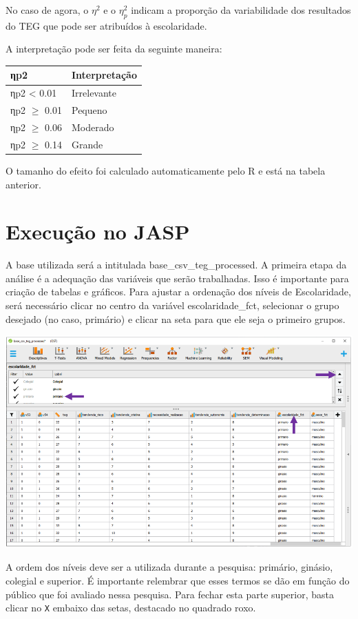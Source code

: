 \documentclass[
]{book}
\begin{document}
No caso de agora, o \(\eta^2\) e o \(\eta_p^2\) indicam a proporção da variabilidade dos resultados do TEG que pode ser atribuídos à escolaridade.

A interpretação pode ser feita da seguinte maneira:

\begin{longtable}[]{@{}ll@{}}
\toprule
ηp2 & Interpretação \\
\midrule
\endhead
ηp2 \textless{} 0.01 & Irrelevante \\
ηp2 \(\geq\) 0.01 & Pequeno \\
ηp2 \(\geq\) 0.06 & Moderado \\
ηp2 \(\geq\) 0.14 & Grande \\
\bottomrule
\end{longtable}

O tamanho do efeito foi calculado automaticamente pelo R e está na tabela anterior.

\hypertarget{execuuxe7uxe3o-no-jasp-6}{%
\section{Execução no JASP}\label{execuuxe7uxe3o-no-jasp-6}}

A base utilizada será a intitulada base\_csv\_teg\_processed. A primeira etapa da análise é a adequação das variáveis que serão trabalhadas. Isso é importante para criação de tabelas e gráficos. Para ajustar a ordenação dos níveis de Escolaridade, será necessário clicar no centro da variável escolaridade\_fct, selecionar o grupo desejado (no caso, primário) e clicar na seta para que ele seja o primeiro grupos.

\includegraphics{./img/cap_anova_ordem_variaveis.png}

A ordem dos níveis deve ser a utilizada durante a pesquisa: primário, ginásio, colegial e superior. É importante relembrar que esses termos se dão em função do público que foi avaliado nessa pesquisa. Para fechar esta parte superior, basta clicar no \texttt{X} embaixo das setas, destacado no quadrado roxo.
\end{document}
